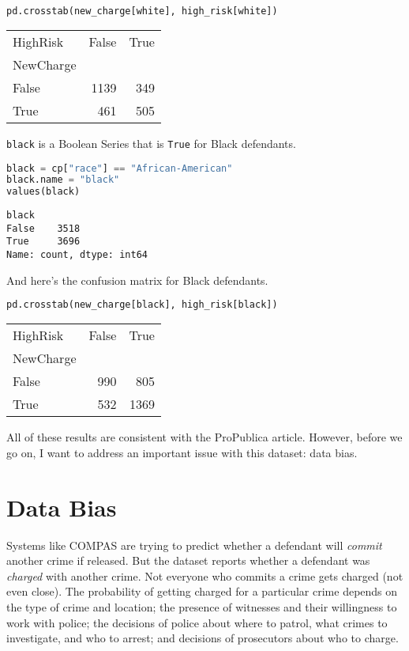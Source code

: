 \begin{lstlisting}[language=Python,style=source]
pd.crosstab(new_charge[white], high_risk[white])
\end{lstlisting}

\begin{tabular}{lrr}
\toprule
HighRisk & False & True \\
NewCharge &  &  \\
\midrule
False & 1139 & 349 \\
True & 461 & 505 \\
\bottomrule
\end{tabular}

\pagebreak

\passthrough{\lstinline!black!} is a Boolean Series that is
\passthrough{\lstinline!True!} for Black defendants.

\begin{lstlisting}[language=Python,style=source]
black = cp["race"] == "African-American"
black.name = "black"
values(black)
\end{lstlisting}

\begin{lstlisting}[style=output]
black
False    3518
True     3696
Name: count, dtype: int64
\end{lstlisting}

And here's the confusion matrix for Black defendants.

\begin{lstlisting}[language=Python,style=source]
pd.crosstab(new_charge[black], high_risk[black])
\end{lstlisting}

\begin{tabular}{lrr}
\toprule
HighRisk & False & True \\
NewCharge &  &  \\
\midrule
False & 990 & 805 \\
True & 532 & 1369 \\
\bottomrule
\end{tabular}

All of these results are consistent with the ProPublica article.
However, before we go on, I want to address an important issue with this
dataset: data bias.

\section{Data Bias}\label{data-bias}

Systems like COMPAS are trying to predict whether a defendant will
\emph{commit} another crime if released. But the dataset reports whether
a defendant was \emph{charged} with another crime. Not everyone who
commits a crime gets charged (not even close). The probability of
getting charged for a particular crime depends on the type of crime and
location; the presence of witnesses and their willingness to work with
police; the decisions of police about where to patrol, what crimes to
investigate, and who to arrest; and decisions of prosecutors about who
to charge.

